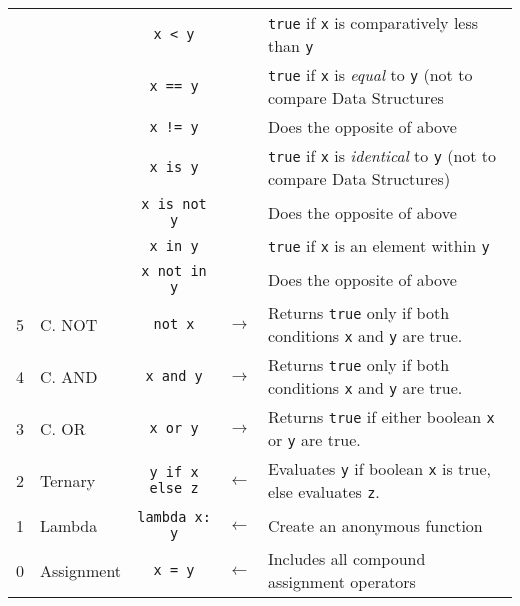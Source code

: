 \documentclass{article}
\begin{document}
\begin{center}
\begin{tabularx}{\textwidth}{clccX}
& & \lstinline|x < y| & & \lstinline|true| if \lstinline|x| is comparatively less than \lstinline|y| \\
& & \lstinline|x == y| & & \lstinline|true| if \lstinline|x| is \textit{equal} to \lstinline|y| (not to compare Data Structures\\
& & \lstinline|x != y|    &  & Does the opposite of above\\
& & \lstinline|x is y| & & \lstinline|true| if \lstinline|x| is \textit{identical} to \lstinline|y| (not to compare Data Structures)\\
& & \lstinline|x is not y| & & Does the opposite of above\\
& & \lstinline|x in y| & & \lstinline|true| if \lstinline|x| is an element within \lstinline|y|\\
& & \lstinline|x not in y| & & Does the opposite of above\\\midrule

5 & C. NOT            & \lstinline|not x|  & \(\to\) & Returns \lstinline|true| only if both conditions \lstinline|x| and \lstinline|y| are true.\\\midrule
4 & C. AND            & \lstinline|x and y|& \(\to\) & Returns \lstinline|true| only if both conditions \lstinline|x| and \lstinline|y| are true.\\\midrule
3 & C. OR             & \lstinline|x or y| & \(\to\) & Returns \lstinline|true| if either boolean \lstinline|x| or \lstinline|y| are true.\\\midrule
2 & Ternary           & \lstinline|y if x else z| & \(\gets\) & Evaluates \lstinline|y| if boolean \lstinline|x| is true, else evaluates \lstinline|z|.\\\midrule

1 & Lambda            & \lstinline|lambda x: y| & \(\gets\) & Create an anonymous function\\\midrule
0 & Assignment        & \lstinline|x = y| & \(\gets\) & Includes all compound assignment operators\\\midrule
\end{tabularx}\end{center}
\end{document}
